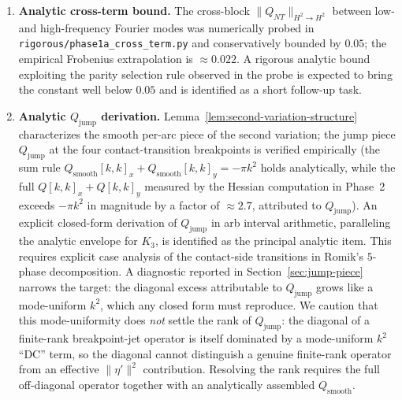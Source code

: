 \documentclass[11pt]{amsart}
\theoremstyle{plain}
\theoremstyle{definition}
\begin{document}
\begin{enumerate}
A first step toward this is now in the repository: for the
\emph{analytic} trajectories (Gerver and its localized perturbations)
the area admits an exact Green's-theorem boundary integral over the
contact paths, evaluated in \textsc{mpmath}
(\texttt{rigorous/analytic\_oracle.py}); it reproduces $A^{\star}$ to
$4\times10^{-16}$ versus Shapely's $2\times10^{-7}$, and made the
quartic-criterion coefficient $C_{4}$ of Section~\ref{sec:quartic}
measurable where the polygon oracle could not.  Promoting
\textsc{mpmath} to \textsc{arb} intervals converts this into a
genuinely certified evaluator on the analytic locus.  The general
$16$-mode Hessian still uses \textsc{shapely}, since a generic
perturbation of the Fourier basis is not one of Romik's five closed-form
arcs; extending the analytic oracle to that basis is the remaining
engineering step.

\item \textbf{Analytic cross-term bound.}
The cross-block $\|Q_{NT}\|_{H^{2} \to H^{2}}$ between low- and
high-frequency Fourier modes was numerically probed in
\texttt{rigorous/phase1a\_cross\_term.py} and conservatively bounded
by $0.05$; the empirical Frobenius extrapolation is $\approx 0.022$.
A rigorous analytic bound exploiting the parity selection rule
observed in the probe is expected to bring the constant well
below $0.05$ and is identified as a short follow-up task.

\item \textbf{Analytic $Q_{\mathrm{jump}}$ derivation.}
Lemma~\ref{lem:second-variation-structure} characterizes the
smooth per-arc piece of the second variation; the jump piece
$Q_{\mathrm{jump}}$ at the four contact-transition breakpoints
is verified empirically (the sum rule $Q_{\mathrm{smooth}}[k,k]_{x}
+ Q_{\mathrm{smooth}}[k,k]_{y} = -\pi k^{2}$ holds analytically,
while the full $Q[k,k]_{x} + Q[k,k]_{y}$ measured by the
Hessian computation in Phase~2 exceeds $-\pi k^{2}$ in magnitude
by a factor of $\approx 2.7$, attributed to $Q_{\mathrm{jump}}$).
An explicit closed-form derivation of $Q_{\mathrm{jump}}$ in arb
interval arithmetic, paralleling the analytic envelope for
$K_{3}$, is identified as the principal analytic item.  This
requires explicit case analysis of the contact-side transitions
in Romik's $5$-phase decomposition.  A diagnostic reported in
Section~\ref{sec:jump-piece} narrows the target: the diagonal
excess attributable to $Q_{\mathrm{jump}}$ grows like a
mode-uniform $k^{2}$, which any closed form must reproduce.  We
caution that this mode-uniformity does \emph{not} settle the rank
of $Q_{\mathrm{jump}}$: the diagonal of a finite-rank
breakpoint-jet operator is itself dominated by a mode-uniform
$k^{2}$ ``DC'' term, so the diagonal cannot distinguish a genuine
finite-rank operator from an effective $\|\eta'\|^{2}$
contribution.  Resolving the rank requires the full off-diagonal
operator together with an analytically assembled
$Q_{\mathrm{smooth}}$.
\end{enumerate}
\end{document}
